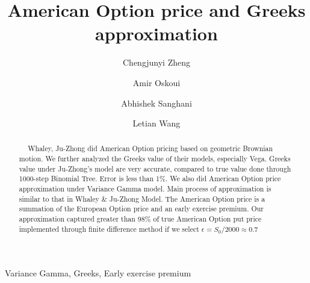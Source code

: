 \documentclass[preprint,12pt,1p]{elsarticle}
\begin{document}
\begin{frontmatter}

\title{\textbf{American Option price and Greeks approximation}}



\author{Chengjunyi Zheng}
\author{Amir Oskoui}
\author{Abhishek Sanghani}
\author{Letian Wang}

\begin{abstract}
 $~~~~$ Whaley, Ju-Zhong did American Option pricing based on geometric Brownian motion. We further analyzed the Greeks value of their models, especially Vega. Greeks value under Ju-Zhong's model are very accurate, compared to true value done through 1000-step Binomial Tree. Error is less than 1\%. We also did American Option price approximation under Variance Gamma model. Main process of approximation is similar to that in Whaley \& Ju-Zhong Model. The American Option price is a summation of the European Option price and an early exercise premium. Our approximation captured greater than 98\% of true American Option put price implemented through finite difference method if we select $\epsilon = S_0/2000 \approx 0.7$
\end{abstract}

\begin{keyword}
Variance Gamma, Greeks, Early exercise premium
\end{keyword}

\end{frontmatter}

\end{document}
